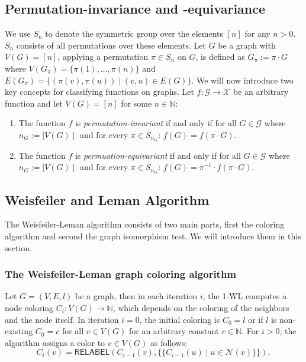 \documentclass[11pt, dvipsnames, DIV=12]{scrreprt}
\theoremstyle{definition}
\newcommand{\MSopen}{\{\!\!\{}
\newcommand{\MSclose}{\}\!\!\}}
\begin{document}
\subsection{Permutation-invariance and -equivariance}
We use $S_n$ to denote the symmetric group over the elements $[n]$ for any $n > 0$. $S_n$ consists of all permutations over these elements. Let $G$ be a graph with $V(G) = [n]$, applying a permutation $\pi \in S_n$ on $G$, is defined as $G_\pi := \pi \cdot G$ where $V(G_\pi) = \{\pi(1), \ldots, \pi(n) \}$ and $E(G_\pi) = \{ (\pi(v), \pi(u)) \mid (v,u) \in E(G)\}$. We will now introduce two key concepts for classifying functions on graphs. Let $f: \mathcal{G} \rightarrow \mathcal{X}$ be an arbitrary function and let $V(G) = [n]$ for some $n \in \mathbb{N}$:
\begin{enumerate}
    \item The function $f$ is \textit{permutation-invariant} if and only if for all $G \in \mathcal{G}$ where $n_G := \mid V(G) \mid$ and for every $\pi \in S_{n_G}$: $f(G) = f(\pi \cdot G)$.
    \item The function $f$ is \textit{permuation-equivariant} if and only if for all $G \in \mathcal{G}$ where $n_G := \mid V(G) \mid$ and for every $\pi \in S_{n_G}$: $f(G) = \pi^{-1} \cdot f(\pi \cdot G)$.
\end{enumerate}


\subsection{Weisfeiler and Leman Algorithm}\label{sec:1-WL Definition}
The Weisfeiler-Leman algorithm consists of two main parts, first the coloring algorithm and second the graph isomorphism test. We will introduce them in this section.

\subsubsection{The Weisfeiler-Leman graph coloring algorithm}
Let $G = (V, E, l)$ be a graph, then in each iteration $i$, the 1-WL computes a node coloring $C_i: V(G) \rightarrow \mathbb{N}$, which depends on the coloring of the neighbors and the node itself. In iteration $i=0$, the initial coloring is $C_0 = l$ or if $l$ is non-existing $C_0 = c$ for all $v \in V(G)$ for an arbitrary constant $c \in \mathbb{N}$. For $i > 0$, the algorithm assigns a color to $v \in V(G)$ as follows:
\begin{equation*}
C_i (v) = \textsf{RELABEL}(C_{i-1}(v), \MSopen C_{i-1}(u) \mid u \in \mathcal{N}(v) \MSclose),
\end{equation*}
\end{document}
